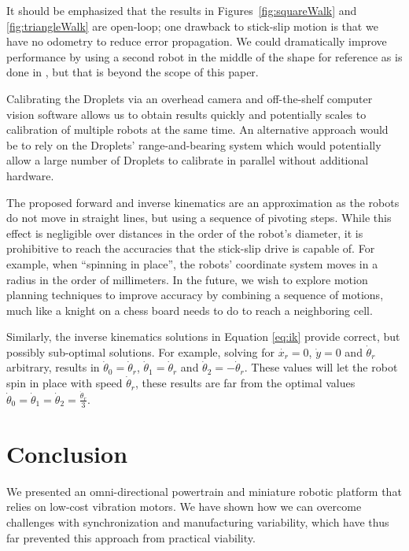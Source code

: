 \documentclass[letterpaper, 10pt, conference]{ieeeconf}
\begin{document}
It should be emphasized that the results in Figures~\ref{fig:squareWalk} and \ref{fig:triangleWalk} are open-loop; one drawback to stick-slip motion is that we have no odometry to reduce error propagation. We could dramatically improve performance by using a second robot in the middle of the shape for reference as is done in \cite{rubenstein2012kilobot}, but that is beyond the scope of this paper.

Calibrating the Droplets via an overhead camera and off-the-shelf computer vision software allows us to obtain results quickly and potentially scales to calibration of multiple robots at the same time. An alternative approach would be to rely on the Droplets' range-and-bearing system \cite{farrow14} which would potentially allow a large number of Droplets to calibrate in parallel without additional hardware. 

The proposed forward and inverse kinematics are an approximation as the robots do not move in straight lines, but using a sequence of pivoting steps. While this effect is negligible over distances in the order of the robot's diameter, it is prohibitive to reach the accuracies that the stick-slip drive is capable of. For example, when ``spinning in place'', the robots' coordinate system moves in a radius in the order of millimeters. In the future, we wish to explore motion planning techniques to improve accuracy by combining a sequence of motions, much like a knight on a chess board needs to do to reach a neighboring cell. 

Similarly, the inverse kinematics solutions in Equation \ref{eq:ik} provide correct, but possibly sub-optimal solutions. For example, solving for $\dot{x_r}=0$, $\dot{y}=0$ and $\dot{\theta}_r$ arbitrary, results in $\dot{\theta}_0=\dot{\theta}_r$, $\dot{\theta}_1=\dot{\theta}_r$ and $\dot{\theta}_2=-\dot{\theta}_r$. These values will let the robot spin in place with speed $\dot{\theta}_r$, these results are far from the optimal values $\dot{\theta}_0=\dot{\theta}_1=\dot{\theta}_2=\frac{\dot{\theta}_r}{3}$. 

\section{Conclusion}
We presented an omni-directional powertrain and miniature robotic platform that relies on low-cost vibration motors. We have shown how we can overcome challenges with synchronization and manufacturing variability, which have thus far prevented this approach from practical viability. 
\end{document}
